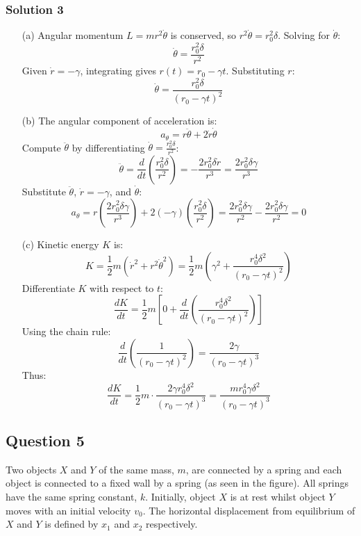 \documentclass{article}
\begin{document}
\subsubsection{Solution 3}
\begin{enumerate}
\item[(a)] Angular momentum \( L = m r^2 \dot{\theta} \) is conserved, so \( r^2 \dot{\theta} = r_0^2 \delta \). Solving for \( \dot{\theta} \):
\[
\dot{\theta} = \frac{r_0^2 \delta}{r^2}
\]
Given \( \dot{r} = -\gamma \), integrating gives \( r(t) = r_0 - \gamma t \). Substituting \( r \):
\[
\dot{\theta} = \frac{r_0^2 \delta}{(r_0 - \gamma t)^2}
\]

\item[(b)] The angular component of acceleration is:
\[
a_\theta = r \ddot{\theta} + 2 \dot{r} \dot{\theta}
\]
Compute \( \ddot{\theta} \) by differentiating \( \dot{\theta} = \frac{r_0^2 \delta}{r^2} \):
\[
\ddot{\theta} = \frac{d}{dt}\left(\frac{r_0^2 \delta}{r^2}\right) = -\frac{2 r_0^2 \delta \dot{r}}{r^3} = \frac{2 r_0^2 \delta \gamma}{r^3}
\]
Substitute \( \ddot{\theta} \), \( \dot{r} = -\gamma \), and \( \dot{\theta} \):
\[
a_\theta = r \left(\frac{2 r_0^2 \delta \gamma}{r^3}\right) + 2(-\gamma)\left(\frac{r_0^2 \delta}{r^2}\right) = \frac{2 r_0^2 \delta \gamma}{r^2} - \frac{2 r_0^2 \delta \gamma}{r^2} = 0
\]

\item[(c)] Kinetic energy \( K \) is:
\[
K = \frac{1}{2} m \left( \dot{r}^2 + r^2 \dot{\theta}^2 \right) = \frac{1}{2} m \left( \gamma^2 + \frac{r_0^4 \delta^2}{(r_0 - \gamma t)^2} \right)
\]
Differentiate \( K \) with respect to \( t \):
\[
\frac{dK}{dt} = \frac{1}{2} m \left[ 0 + \frac{d}{dt} \left( \frac{r_0^4 \delta^2}{(r_0 - \gamma t)^2} \right) \right]
\]
Using the chain rule:
\[
\frac{d}{dt} \left( \frac{1}{(r_0 - \gamma t)^2} \right) = \frac{2 \gamma}{(r_0 - \gamma t)^3}
\]
Thus:
\[
\frac{dK}{dt} = \frac{1}{2} m \cdot \frac{2 \gamma r_0^4 \delta^2}{(r_0 - \gamma t)^3} = \frac{m r_0^4 \gamma \delta^2}{(r_0 - \gamma t)^3}
\]
\end{enumerate}

\subsection{Question 5}

Two objects $X$ and $Y$ of the same mass, $m$, are connected by a spring and each object is connected to a fixed wall by a spring (as seen in the figure). All springs have the same spring constant, $k$. Initially, object $X$ is at rest whilst object $Y$ moves with an initial velocity $v_0$. The horizontal displacement from equilibrium of $X$ and $Y$ is defined by $x_1$ and $x_2$ respectively.
\end{document}
